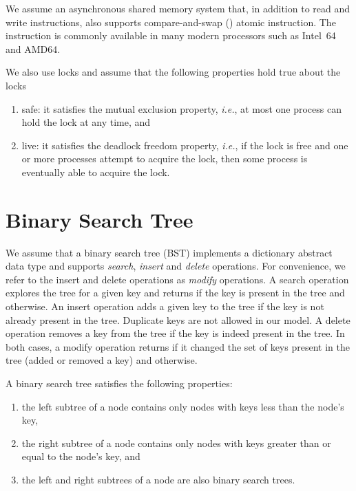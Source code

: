 We assume an asynchronous shared memory system that, in addition to read and write instructions, also supports compare-and-swap (\CAS{}) atomic instruction. The \CAS{} instruction is commonly available in many modern processors such as Intel~64 and AMD64. 

We also use locks and assume that the following properties hold true about the locks
\begin{enumerate}[label=(\alph*)]
\item safe: it satisfies the mutual exclusion property, \emph{i.e.}, at most one process can hold the lock at any time, and 
\item live: it satisfies the deadlock freedom property, \emph{i.e.}, if the lock is free and one or more processes attempt to acquire the lock, then some process is eventually able to acquire the lock.
\end{enumerate}

\section{Binary Search Tree}
We assume that a binary search tree (BST) implements a dictionary abstract data type and supports \emph{search}, \emph{insert} and \emph{delete} operations. For convenience, we refer to the insert and delete operations as \emph{modify} operations. A search operation explores the tree for a given key and returns \true{} if the key is present in the tree and \false{} otherwise. An insert operation adds a given key to the tree if the key is not already present in the tree. Duplicate keys are not allowed in our model. A delete operation removes a key from the tree if the key is indeed present in the tree. In both cases, a modify operation returns \true{} if it changed the set of keys present in the tree (added or removed a key) and \false{} otherwise.

A binary search tree satisfies the following properties:
\begin{enumerate}[label=(\alph*)]
\item the left subtree of a node contains only nodes with keys less than the node's key, 
\item the right subtree of a node contains only nodes with keys greater than or equal to the node's key, and
\item the left and right subtrees of a node are also binary search trees.
\end{enumerate}

